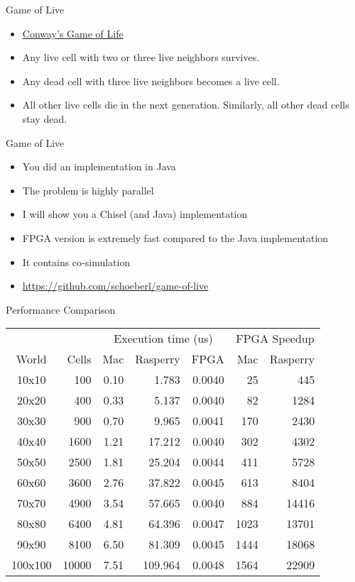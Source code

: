 \begin{frame}[fragile]{Game of Live}
\begin{itemize}
\item \href{https://en.wikipedia.org/wiki/Conway\%27s_Game_of_Life}{Conway's Game of Life}
\item Any live cell with two or three live neighbors survives.
\item Any dead cell with three live neighbors becomes a live cell.
\item All other live cells die in the next generation. Similarly, all other dead cells stay dead.
\end{itemize}
\end{frame}

\begin{frame}[fragile]{Game of Live}
\begin{itemize}
\item You did an implementation in Java
\item The problem is highly parallel
\item I will show you a Chisel (and Java) implementation
\item FPGA version is extremely fast compared to the Java implementation
\item It contains co-simulation
\item \url{https://github.com/schoeberl/game-of-live}
\end{itemize}
\end{frame}

\begin{frame}[fragile]{Performance Comparison}
\begin{table}
  \centering
\begin{tabular}{crrrrrr}
    \toprule
    & &\multicolumn{3}{c}{Execution time (us)} & \multicolumn{2}{c}{FPGA Speedup}\\
World & Cells&Mac&Rasperry&FPGA& Mac& Rasperry\\
\midrule
10x10 & 100&0.10&1.783&0.0040&25&445\\
20x20 & 400&0.33&5.137&0.0040&82&1284\\
30x30 & 900&0.70&9.965&0.0041&170&2430\\
40x40 & 1600&1.21&17.212&0.0040&302&4302\\
50x50 & 2500&1.81&25.204&0.0044&411&5728\\
60x60 & 3600&2.76&37.822&0.0045&613&8404\\
70x70 & 4900&3.54&57.665&0.0040&884&14416\\
80x80 & 6400&4.81&64.396&0.0047&1023&13701\\
90x90 & 8100&6.50&81.309&0.0045&1444&18068\\
100x100 & 10000&7.51&109.964&0.0048&1564&22909\\
\bottomrule
\end{tabular}
    \label{tab:speedup}
\end{table}
\end{frame}


